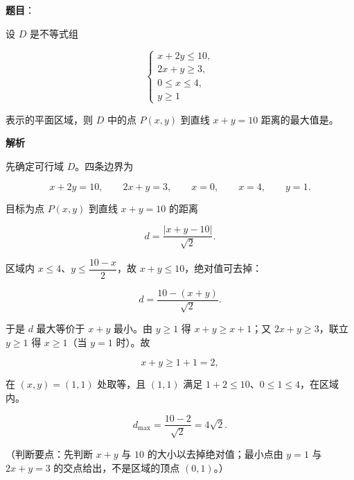 \begin{answer}

\textbf{题目}：

设 $D$ 是不等式组

\nopagebreak[4]
\[\begin{cases}
x+2y\leqslant10,\\
2x+y\geqslant3,\\
0\leqslant x\leqslant4,\\
y\geqslant1
\end{cases}\]

表示的平面区域，则 $D$ 中的点 $P(x,y)$ 到直线 $x+y=10$ 距离的最大值是\gkblank{}。

\textbf{解析}

先确定可行域 $D$。四条边界为

\nopagebreak[4]
\[x+2y=10,\qquad 2x+y=3,\qquad x=0,\qquad x=4,\qquad y=1.\]

目标为点 $P(x,y)$ 到直线 $x+y=10$ 的距离

\nopagebreak[4]
\[d=\frac{|x+y-10|}{\sqrt2}.\]

区域内 $x\leqslant4$、$y\leqslant\dfrac{10-x}{2}$，故 $x+y\leqslant10$，绝对值可去掉：

\nopagebreak[4]
\[d=\frac{10-(x+y)}{\sqrt2}.\]

于是 $d$ 最大等价于 $x+y$ 最小。由 $y\geqslant1$ 得 $x+y\geqslant x+1$；又 $2x+y\geqslant3$，联立 $y\geqslant1$ 得 $x\geqslant1$（当 $y=1$ 时）。故

\nopagebreak[4]
\[x+y\geqslant1+1=2,\]

在 $(x,y)=(1,1)$ 处取等，且 $(1,1)$ 满足 $1+2\leqslant10$、$0\leqslant1\leqslant4$，在区域内。

\nopagebreak[4]
\[d_{\max}=\frac{10-2}{\sqrt2}=4\sqrt2.\]

（判断要点：先判断 $x+y$ 与 $10$ 的大小以去掉绝对值；最小点由 $y=1$ 与 $2x+y=3$ 的交点给出，不是区域的顶点 $(0,1)$。）


\end{answer}
